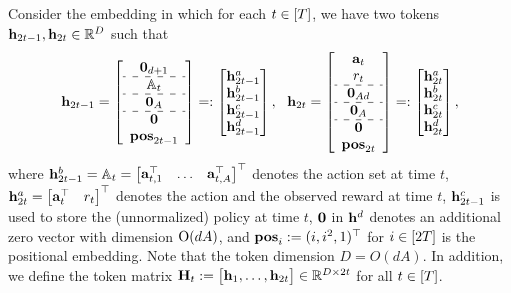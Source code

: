 Consider the embedding in which for each $t\in[{T}]$, we have two tokens ${\mathbf h}_{2t-1},{\mathbf h}_{2t}\in\mathbb{R}^D$ such that
\[
\begin{aligned}
\bh_{2t-1}=
\left[
\begin{array}{c}
     \bzero_{d+1} \\
     \hdashline
     \sA_t\\  
     \hdashline
     \bzero_A\\  
     \hdashline
      \bzero\\ \posv_{2t-1}
\end{array}
\right]
=:
\begin{bmatrix}
     \bh_{2t-1}^{\parta} \\  \bh_{2t-1}^{\partb}\\  \bh_{2t-1}^{\partc}\\   \bh_{2t-1}^{\partd}\\
\end{bmatrix},~~
\bh_{2t}=
\left[
\begin{array}{cc}
     \ba_{t} \\
      r_t\\  
      \hdashline
       \bzero_{Ad}\\ 
       \hdashline 
       \bzero_{A}\\ 
       \hdashline  
       \bzero\\ \posv_{2t}
\end{array}
\right]=:
\begin{bmatrix}
    \bh_{2t}^{\parta} \\  \bh_{2t}^{\partb}\\   \bh_{2t}^{\partc}\\   \bh_{2t}^{\partd}
\end{bmatrix},
\end{aligned}
\]
where ${\mathbf h}_{2t-1}^{{b}}={\mathbb{A}}_t=\begin{bmatrix}
    {\mathbf a}_{t,1}^\top &\ldots & {\mathbf a}_{t,A}^\top
\end{bmatrix}^\top$ denotes the action set at time $t$, ${\mathbf h}_{2t}^{{a}}=\begin{bmatrix}
    {\mathbf a}_t^\top &r_t
\end{bmatrix}^\top$ denotes the action and the observed reward at time $t$, ${\mathbf h}^{c}_{2t-1}$ is used to store the (unnormalized) policy at time  $t$, ${\mathbf 0}$ in ${\mathbf h}^{d}$ denotes an additional zero vector with  dimension ${\mathrm{O}}(dA)$, and ${\mathbf{pos}}_i:=(i,i^2,1)^\top$ for $i\in[2{T}]$ is the positional embedding.    Note that the token dimension $D= O(dA)$. In addition, we define the token matrix ${\mathbf H}_t:=\begin{bmatrix}
    {\mathbf h}_1,\ldots,{\mathbf h}_{2t}
\end{bmatrix}\in\mathbb{R}^{D\times 2t}$ for all $t\in[{T}]$.




